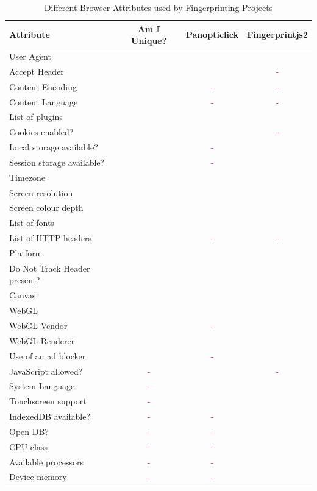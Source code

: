\documentclass[
    fontsize=12pt,
    headings=small,
    parskip=half,
    bibliography=totoc,
    numbers=noenddot,
    open=any
    ]{scrreprt}
\newcommand{\cmark}{\textcolor{green}{\ding{51}}}
\newcommand{\xmark}{\textcolor{red}{-}}
\begin{document}
\renewcommand{\arraystretch}{1.2}
\begin{table}
\centering
\caption{Different Browser Attributes used by Fingerprinting Projects}
\begin{tabular}{ l c c c }
    \toprule
    Attribute & Am I Unique? & Panopticlick & Fingerprintjs2 \\
    \midrule
    User Agent & \cmark & \cmark & \cmark \\[3px]
    Accept Header & \cmark & \cmark & \xmark \\[3px]
    Content Encoding & \cmark & \xmark & \xmark \\[3px]
    Content Language & \cmark & \xmark & \xmark \\[3px]
    List of plugins & \cmark & \cmark & \cmark \\[3px]
    Cookies enabled? & \cmark & \cmark & \xmark \\[3px]
    Local storage available? & \cmark & \xmark & \cmark \\[3px]
    Session storage available? & \cmark & \xmark & \cmark \\[3px]
    Timezone & \cmark & \cmark & \cmark \\[3px]
    Screen resolution & \cmark & \cmark & \cmark \\[3px]
    Screen colour depth & \cmark & \cmark & \cmark \\[3px]
    List of fonts & \cmark & \cmark & \cmark \\[3px]
    List of HTTP headers & \cmark & \xmark & \xmark \\[3px]
    Platform & \cmark & \cmark & \cmark \\[3px]
    Do Not Track Header present? & \cmark & \cmark & \cmark \\[3px]
    Canvas & \cmark & \cmark & \cmark \\[3px]
    WebGL & \cmark & \cmark & \cmark \\[3px]
    WebGL Vendor & \cmark & \xmark & \cmark \\[3px]
    WebGL Renderer & \cmark & \cmark & \cmark \\[3px]
    Use of an ad blocker & \cmark & \xmark & \cmark \\[3px]
    JavaScript allowed? & \xmark & \cmark & \xmark \\[3px]
    System Language & \xmark & \cmark & \cmark \\[3px]
    Touchscreen support & \xmark & \cmark & \cmark \\[3px]
    IndexedDB available? & \xmark & \xmark & \cmark \\[3px]
    Open DB? & \xmark & \xmark & \cmark \\[3px]
    CPU class & \xmark & \xmark & \cmark \\[3px]
    Available processors & \xmark & \xmark & \cmark \\[3px]
    Device memory & \xmark & \xmark & \cmark \\[3px]
    \bottomrule
\end{tabular}
\label{table:attributes_used}
\end{table}
\end{document}
